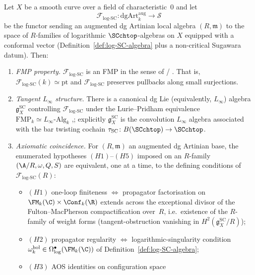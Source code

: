 \begin{theorem}
\label{thm:h-axioms-from-fmp}
Let $X$ be a smooth curve over a field of characteristic~$0$ and let
\[
 \mathcal{F}_{\mathrm{log\text{-}SC}} \colon
 \mathrm{dgArt}^{\mathrm{aug}}_k \longrightarrow \mathcal{S}
\]
be the functor sending an augmented dg Artinian local algebra
$(R,\mathfrak m)$ to the space of $R$-families of
logarithmic $\SCchtop$-algebras on $X$ equipped with a
conformal vector (Definition~\ref{def:log-SC-algebra} plus a
non-critical Sugawara datum). Then:
\begin{enumerate}[label=(\roman*)]
\item \emph{FMP property.} $\mathcal{F}_{\mathrm{log\text{-}SC}}$
 is an FMP in the sense of
 \cite[\S2.1]{Pridham} / \cite[Def.~15.1.1.8]{HA}. That is,
 $\mathcal{F}_{\mathrm{log\text{-}SC}}(k) \simeq \mathrm{pt}$ and
 $\mathcal{F}_{\mathrm{log\text{-}SC}}$ preserves pullbacks along
 small surjections.
\item \emph{Tangent $L_\infty$ structure.} There is a canonical
 dg Lie (equivalently, $L_\infty$) algebra
 $\mathfrak g^{\mathrm{SC}}_X$ controlling
 $\mathcal{F}_{\mathrm{log\text{-}SC}}$ under the Lurie--Pridham
 equivalence $\mathrm{FMP}_k \simeq L_\infty\text{-}\mathrm{Alg}_k$
 \cite[\S4]{Pridham},\cite[Thm.~15.3.4.2]{HA}; explicitly
 $\mathfrak g^{\mathrm{SC}}_X$ is the convolution $L_\infty$
 algebra associated with the bar twisting cochain
 $\tau_{\mathrm{SC}} \colon B(\SCchtop) \to \SCchtop$.
\item \emph{Axiomatic coincidence.} For $(R,\mathfrak m)$ an
 augmented dg Artinian base, the enumerated hypotheses
 $(H1)$--$(H5)$ imposed on an $R$-family $(\A/R, \omega, Q, S)$
 are equivalent, one at a time, to the defining conditions
 of $\mathcal{F}_{\mathrm{log\text{-}SC}}(R)$:
 \begin{itemize}
 \item $(H1)$ \textup{one-loop finiteness} $\iff$ propagator
 factorisation on $\FM_k(\C) \times \Conf_k(\R)$ extends
 across the exceptional divisor of the Fulton--MacPherson
 compactification over~$R$, i.e.\ existence of the
 $R$-family of weight forms (tangent-obstruction vanishing
 in $H^2(\mathfrak g^{\mathrm{SC}}_X / R)$);
 \item $(H2)$ \textup{propagator regularity} $\iff$
 logarithmic-singularity condition
 $\omega_k^{\mathrm{hol}} \in \Omega^\bullet_{\log}(\FM_k(\C))$
 of Definition~\ref{def:log-SC-algebra};
 \item $(H3)$ \textup{AOS identities on configuration space}

\end{itemize}
\end{enumerate}
\end{theorem}
